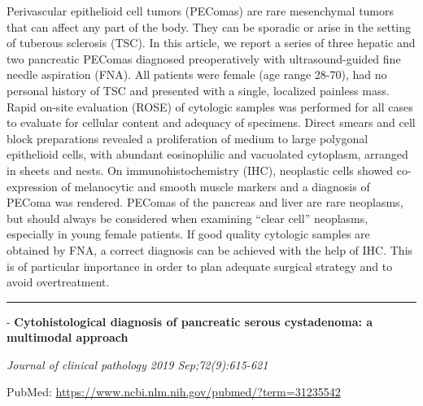 \documentclass[]{article}
\begin{document}
Perivascular epithelioid cell tumors (PEComas) are rare mesenchymal
tumors that can affect any part of the body. They can be sporadic or
arise in the setting of tuberous sclerosis (TSC). In this article, we
report a series of three hepatic and two pancreatic PEComas diagnosed
preoperatively with ultrasound-guided fine needle aspiration (FNA). All
patients were female (age range 28-70), had no personal history of TSC
and presented with a single, localized painless mass. Rapid on-site
evaluation (ROSE) of cytologic samples was performed for all cases to
evaluate for cellular content and adequacy of specimens. Direct smears
and cell block preparations revealed a proliferation of medium to large
polygonal epithelioid cells, with abundant eosinophilic and vacuolated
cytoplasm, arranged in sheets and nests. On immunohistochemistry (IHC),
neoplastic cells showed co-expression of melanocytic and smooth muscle
markers and a diagnosis of PEComa was rendered. PEComas of the pancreas
and liver are rare neoplasms, but should always be considered when
examining ``clear cell'' neoplasms, especially in young female patients.
If good quality cytologic samples are obtained by FNA, a correct
diagnosis can be achieved with the help of IHC. This is of particular
importance in order to plan adequate surgical strategy and to avoid
overtreatment.

{}

{}

\begin{center}\rule{0.5\linewidth}{\linethickness}\end{center}

 - \textbf{Cytohistological diagnosis of pancreatic serous cystadenoma:
a multimodal approach}

\emph{Journal of clinical pathology 2019 Sep;72(9):615-621}

PubMed: \url{https://www.ncbi.nlm.nih.gov/pubmed/?term=31235542}
\end{document}
